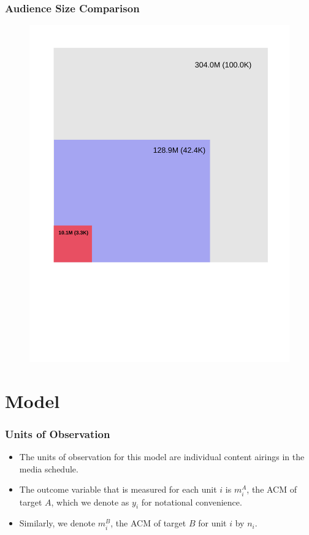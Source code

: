 \documentclass{beamer}
\begin{document}
\begin{frame}
\frametitle{Audience Size Comparison}
\begin{figure}[!h]
  \centering
  \includegraphics[scale=0.35]{panel}
\end{figure}
\end{frame}


\section{Model}

\begin{frame}
\frametitle{Units of Observation}
\begin{itemize}
  \item The units of observation for this model are individual content airings in the media schedule.
    \pause
  \item The outcome variable that is measured for each unit $i$ is $m_i^A$, the ACM of target $A$, which we
    denote as $y_i$ for notational convenience.
    \pause
  \item Similarly, we denote $m_i^B$, the ACM of target $B$ for unit $i$ by $n_i$.
\end{itemize}

\end{frame}
\end{document}
